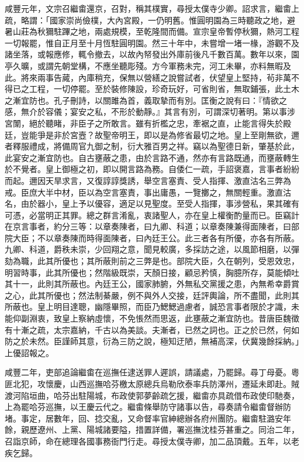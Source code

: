\begin{pinyinscope}
咸豐元年，文宗召繼畬還京，召對，稱其樸實，尋授太僕寺少卿。詔求言，繼畬上疏，略謂：「國家崇尚儉樸，大內宮殿，一仍明舊。惟圓明園為三時聽政之地，避暑山莊為秋獮駐蹕之地，兩處規模，至乾隆間而備。宣宗皇帝暫停秋獮，熱河工程一切報罷，惟自正月至十月恆駐圓明園。然三十年中，未嘗增一堵一椽，游觀不及諸坐落，或報應修，輒令撤去，以故內帑發出外庫前後凡千數百萬。數年以來，園亭久曠，或謂先朝堂構，不應坐聽彫殘。方今軍務未完，河工未畢，亦料無暇及此。將來兩事告蕆，內庫稍充，保無以營繕之說嘗試者，伏望皇上堅持，茍非萬不得已之工程，一切停罷。至於裝修陳設，珍奇玩好，可省則省，無取鋪張，此土木之漸宜防也。孔子刪詩，以關雎為首，義取摯而有別。匡衡之說有曰：『情欲之感，無介於容儀；宴安之私，不形於動靜。』其言有別，可謂深切著明。第以事涉宮闈，絕於聽睹，非臣子之所敢言。雖有折檻之忠，牽裾之直，止能言得失於殿廷，豈能爭是非於宮壼？故聖帝明王，即以是為修省最切之地。皇上至剛無欲，邇者釋服禮成，將備周官九御之制，衍大雅百男之祥。竊以為聖德日新，肇基於此，此宴安之漸宜防也。自古壅蔽之患，由於言路不通，然亦有言路既通，而壅蔽轉生於不覺者。皇上御極之初，即以開言路為務。自倭仁一疏，手詔褒嘉，言事者紛紛而起。邇因天旱求言，又復諄諄獎誘，舉空言塞責、受人指揮、激直沽名三弊為戒。臣庶大半中材，臣以為空言塞責，事出庸愚，一覽擲之，無關輕重。激直沽名，由於器小，皇上予以優容，適足以見聖度。至受人指揮，事涉營私，果其確有可憑，必當明正其罪。總之群言淆亂，衷諸聖人，亦在皇上權衡酌量而已。臣竊計在京言事者，約分三等：以章奏陳者，曰九卿、科道；以章奏陳兼得面陳者，曰部院大臣；不以章奏陳而時得面陳者，曰內廷王公。此三者各有所優，亦各有所蔽。九卿、科道，爵秩未崇，少回翔之意，聞見較廣，多採訪之途，以風節相磨，以彈劾為職，此其所優也；其所蔽則前之三弊是也。部院大臣，久在朝列，受恩效忠，明習時事，此其所優也；然階級既崇，天顏日接，顧忌矜慎，胸臆所存，莫能傾吐其十一，此則其所蔽也。內廷王公，國家肺腑，外無私交黨援之患，內無希幸爵賞之心，此其所優也；然法制綦嚴，例不與外人交接，廷評輿論，所不盡聞，此則其所蔽也。皇上明目達聰，幽隱畢照，而臣乃鰓鰓過慮者，誠恐言事者限於才識，未能仰副淵衷，致皇上察納虛懷，不免悵然而思返，此壅蔽之漸宜防也。昔唐臣魏徵有十漸之疏，太宗嘉納，千古以為美談。夫漸者，已然之詞也。正之於已然，何如防之於未然。臣謹師其意，衍為三防之說，極知迂陋，無補高深，伏冀幾餘採納。」上優詔報之。

咸豐二年，吏部追論繼畬在巡撫任逮送罪人遲誤，請議處，乃罷歸。尋丁母憂。粵匪北犯，攻懷慶，山西巡撫哈芬檄太原總兵烏勒欣泰率兵防澤州，遷延未即赴。賊渡河陷垣曲，哈芬出駐陽城，布政使郭夢齡疏乞援，繼畬亦具疏借布政使印馳奏，上為罷哈芬巡撫，以王慶云代之。繼畬條舉防守諸事以告，尋奏請令繼畬督辦防堵。事定，居數年，回、捻交亂，又命督率官紳總辦各府州團防。繼畬駐潞安年餘，親歷遼州、上黨、陽城諸要隘，措置詳備，署巡撫沈桂芬甚重之。同治二年，召詣京師，命在總理各國事務衙門行走。尋授太僕寺卿，加二品頂戴。五年，以老疾乞歸。


\end{pinyinscope}
